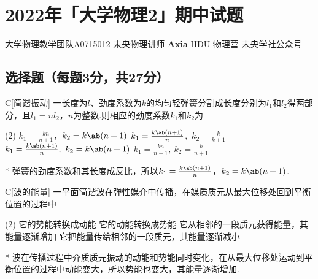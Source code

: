 \chapter{2022年「大学物理2」期中试题}
\date{2022年11月12日}{大学物理教学团队}{A0715012}
{未央物理讲师 \href{https://qm.qq.com/q/UPbGudx8cK}{\textbf{Axia}}}
{}{\href{https://qm.qq.com/q/asJiytD5pC}{HDU 物理营}}
{}{\href{http://weixin.qq.com/r/mhKYgFTEMQlOrRDj90eI}{未央学社公众号}}

\section{选择题（每题3分，共27分）}
\begin{choice}{C}[简谐振动]
    一长度为$l$、劲度系数为$k$的均匀轻弹簧分割成长度分别为$l_1$和$l_2$得两部分，且$l_1=nl_2$，$n$为整数.则相应的劲度系数$k_1$和$k_2$为
    \begin{tasks}(2)
        \task $k_1=\frac{kn}{n+1}$，$k_2=k\ab(n+1)$
        \task $k_1=\frac{k\ab(n+1)}{n}$,\ $k_2=\frac{k}{k+1}$
        \task $k_1=\frac{k\ab(n+1)}{n},\ k_2=k\ab(n+1)$
        \task $k_1=\frac{kn}{n+1},\ k_2=\frac{k}{n+1}$
    \end{tasks}
\end{choice}
\begin{solution}*
    弹簧的劲度系数和其长度成反比，所以$k_1=\frac{k\ab(n+1)}{n}$，$k_2=k\ab(n+1)$.
\end{solution}

\begin{choice}{C}[波的能量]
    一平面简谐波在弹性媒介中传播，在媒质质元从最大位移处回到平衡位置的过程中
    \begin{tasks}(2)
        \task 它的势能转换成动能
        \task 它的动能转换成势能
        \task 它从相邻的一段质元获得能量，其能量逐渐增加
        \task 它把能量传给相邻的一段质元，其能量逐渐减小
    \end{tasks}
\end{choice}
\begin{solution}*
    波在传播过程中介质质元振动的动能和势能同时变化，在从最大位移处运动到平衡位置的过程中动能变大，所以势能也变大，其能量逐渐增加.
\end{solution}

